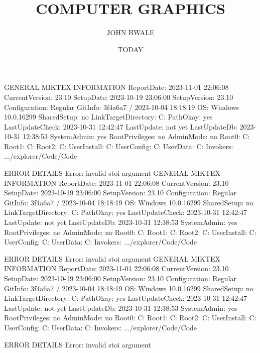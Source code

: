 \documentclass{article}
\author{JOHN BWALE}
\title{COMPUTER GRAPHICS}
\date{TODAY}
\begin{document}
GENERAL MIKTEX INFORMATION
ReportDate: 2023-11-01 22:06:08
CurrentVersion: 23.10
SetupDate: 2023-10-19 23:06:00
SetupVersion: 23.10
Configuration: Regular
GitInfo: 3f4a6a7 / 2023-10-04 18:18:19
OS: Windows 10.0.16299
SharedSetup: no
LinkTargetDirectory: C:\Users\JOHN\AppData\Local\Programs\MiKTeX\miktex\bin{}
PathOkay: yes
LastUpdateCheck: 2023-10-31 12:42:47
LastUpdate: not yet
LastUpdateDb: 2023-10-31 12:38:53
SystemAdmin: yes
RootPrivileges: no
AdminMode: no
Root0: C:\Users\JOHN\AppData\Roaming\MiKTeX
Root1: C:\Users\JOHN\AppData\Local\MiKTeX
Root2: C:\Users\JOHN\AppData\Local\Programs\MiKTeX
UserInstall: C:\Users\JOHN\AppData\Local\Programs\MiKTeX
UserConfig: C:\Users\JOHN\AppData\Roaming\MiKTeX
UserData: C:\Users\JOHN\AppData\Local\MiKTeX
Invokers: .../explorer/Code/Code

ERROR DETAILS
Error: invalid stoi argument
GENERAL MIKTEX INFORMATION
ReportDate: 2023-11-01 22:06:08
CurrentVersion: 23.10
SetupDate: 2023-10-19 23:06:00
SetupVersion: 23.10
Configuration: Regular
GitInfo: 3f4a6a7 / 2023-10-04 18:18:19
OS: Windows 10.0.16299
SharedSetup: no
LinkTargetDirectory: C:\Users\JOHN\AppData\Local\Programs\MiKTeX\miktex\bin{}
PathOkay: yes
LastUpdateCheck: 2023-10-31 12:42:47
LastUpdate: not yet
LastUpdateDb: 2023-10-31 12:38:53
SystemAdmin: yes
RootPrivileges: no
AdminMode: no
Root0: C:\Users\JOHN\AppData\Roaming\MiKTeX
Root1: C:\Users\JOHN\AppData\Local\MiKTeX
Root2: C:\Users\JOHN\AppData\Local\Programs\MiKTeX
UserInstall: C:\Users\JOHN\AppData\Local\Programs\MiKTeX
UserConfig: C:\Users\JOHN\AppData\Roaming\MiKTeX
UserData: C:\Users\JOHN\AppData\Local\MiKTeX
Invokers: .../explorer/Code/Code

ERROR DETAILS
Error: invalid stoi argument
GENERAL MIKTEX INFORMATION
ReportDate: 2023-11-01 22:06:08
CurrentVersion: 23.10
SetupDate: 2023-10-19 23:06:00
SetupVersion: 23.10
Configuration: Regular
GitInfo: 3f4a6a7 / 2023-10-04 18:18:19
OS: Windows 10.0.16299
SharedSetup: no
LinkTargetDirectory: C:\Users\JOHN\AppData\Local\Programs\MiKTeX\miktex\bin{}
PathOkay: yes
LastUpdateCheck: 2023-10-31 12:42:47
LastUpdate: not yet
LastUpdateDb: 2023-10-31 12:38:53
SystemAdmin: yes
RootPrivileges: no
AdminMode: no
Root0: C:\Users\JOHN\AppData\Roaming\MiKTeX
Root1: C:\Users\JOHN\AppData\Local\MiKTeX
Root2: C:\Users\JOHN\AppData\Local\Programs\MiKTeX
UserInstall: C:\Users\JOHN\AppData\Local\Programs\MiKTeX
UserConfig: C:\Users\JOHN\AppData\Roaming\MiKTeX
UserData: C:\Users\JOHN\AppData\Local\MiKTeX
Invokers: .../explorer/Code/Code

ERROR DETAILS
Error: invalid stoi argument
\end{document}
